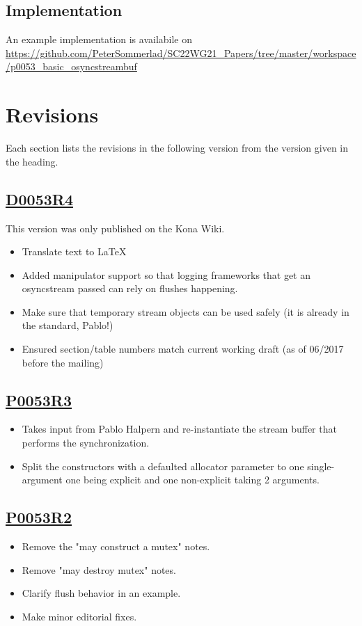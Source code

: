 \documentclass[ebook,11pt,article]{memoir}
\begin{document}
\section{Implementation}
An example implementation is availabile on \url{https://github.com/PeterSommerlad/SC22WG21_Papers/tree/master/workspace/p0053_basic_osyncstreambuf}

\chapter{Revisions}
Each section lists the revisions in the following version from the version given in the heading.
\section{\href{http://wiki.edg.com/pub/Wg21kona2017/LibraryEvolutionWorkingGroup/p0053r4.html}{D0053R4}}
This version was only published on the Kona Wiki.
\begin{itemize}
\item Translate text to LaTeX
\item Added manipulator support so that logging frameworks that get an osyncstream passed can rely on flushes happening.
\item Make sure that temporary stream objects can be used safely (it is already in the standard, Pablo!)
\item Ensured section/table numbers match current working draft (as of 06/2017 before the mailing)
\end{itemize}

\section{\href{https://wg21.link/P0053R3}{P0053R3}}
\begin{itemize}
\item Takes input from Pablo Halpern and re-instantiate the stream buffer that performs the synchronization.
\item Split the constructors with a defaulted allocator parameter to one single-argument one being explicit and one non-explicit taking 2 arguments.
\end{itemize}

\section{\href{https://wg21.link/P0053R2}{P0053R2}}
\begin{itemize}
\item Remove the "may construct a mutex" notes.
\item Remove "may destroy mutex" notes.
\item Clarify  flush behavior in an example.
\item Make minor editorial fixes.
\end{itemize}
\end{document}
